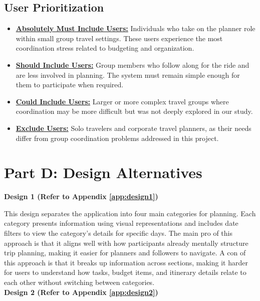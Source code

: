 \documentclass[12pt,a4paper]{article}
\begin{document}
\subsection{User Prioritization}

\begin{itemize}[topsep=4pt,itemsep=4pt,parsep=0pt,partopsep=0pt]

    \item \underline{\textbf{Absolutely Must Include Users:}}
    Individuals who take on the planner role within small group travel settings. These users experience the most coordination stress related to budgeting and organization.

    \item \underline{\textbf{Should Include Users:}}
    Group members who follow along for the ride and are less involved in planning. The system must remain simple enough for them to participate when required.

    \item \underline{\textbf{Could Include Users:}}
    Larger or more complex travel groups where coordination may be more difficult but was not deeply explored in our study.

    \item \underline{\textbf{Exclude Users:}}
    Solo travelers and corporate travel planners, as their needs differ from group coordination problems addressed in this project.

\end{itemize}


\section{Part D:  Design Alternatives}
\textbf{Design 1 (Refer to Appendix \ref{app:design1})}

This design separates the application into four main categories for planning. Each category presents information using visual representations and includes date filters to view the category’s details for specific days. The main pro of this approach is that it aligns well with how participants already mentally structure trip planning, making it easier for planners and followers to navigate. A con of this approach is that it breaks up information across sections, making it harder for users to understand how tasks, budget items, and itinerary details relate to each other without switching between categories.
\\

\textbf{Design 2 (Refer to Appendix \ref{app:design2})}
\end{document}
